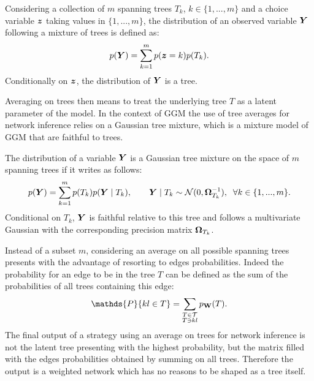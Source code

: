  
 \begin{definition}
 Considering a collection of $m$ spanning trees $T_k$, $k\in\{1,...,m\}$ and a choice variable ${\boldsymbol{z}}$ taking values in $\{1,...,m\}$, the distribution of an observed variable ${\boldsymbol{Y}}$ following a  mixture of trees  is defined as:
$$ p({\boldsymbol{Y}}) = \sum_{k=1}^m p({\boldsymbol{z}}=k) p(T_k).$$
Conditionally on ${\boldsymbol{z}}$, the distribution of ${\boldsymbol{Y}}$ is a tree.
 \end{definition}

Averaging on trees then means to treat the underlying tree $T$ as a latent parameter of the model. In the context of GGM  the use of tree averages for network inference relies on a Gaussian tree mixture, which is a mixture model of GGM that are faithful to trees.
\begin{definition}\label{treemixt}
The distribution of a variable ${\boldsymbol{Y}}$ is a Gaussian tree mixture on the space of $m$ spanning trees if it writes as follows:
$$p({\boldsymbol{Y}}) = \sum_{k=1}^m  p(T_k) p({\boldsymbol{Y}}\mid T_k),\qquad  {\boldsymbol{Y}}\mid T_k\sim\mathcal{N} (0, {\boldsymbol{\Omega}}_{T_k}^{-1}), \;\; \forall k\in\{1,...,m\}.$$
Conditional on $T_k$, ${\boldsymbol{Y}}$ is faithful relative to this tree and follows a multivariate Gaussian with the corresponding precision matrix ${\boldsymbol{\Omega}}_{T_k}$.
\end{definition}
 
Instead of a subset $m$, considering an average on all possible spanning trees %
presents with the advantage of  resorting to edges probabilities. Indeed the probability for an edge to be in the tree $T$ can be defined as the sum of the probabilities of all trees containing this edge:
$$\mathds{P}\{kl\in T\} = \sum_{\substack{T\in \mathcal{T}\\ T \ni kl}} p_{\Wbf}(T).$$
The final output of a strategy using an average on trees for network inference is not the latent tree presenting with the highest probability, but the matrix filled with the edges probabilities obtained by summing on all trees. Therefore the output is a weighted network which has no reasons to be shaped as a tree itself.\\


